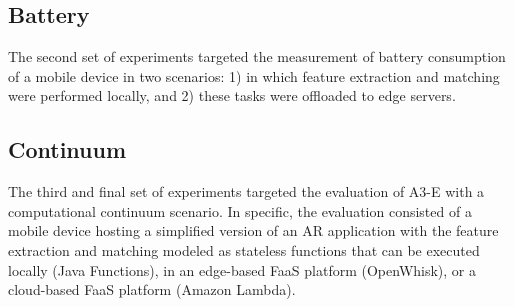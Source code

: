 \subsection{Battery} The second set of experiments targeted the measurement of battery consumption of a mobile device in two scenarios: 1) in which feature extraction and matching were performed locally, and 2) these tasks were offloaded to edge servers.

\subsection{Continuum} The third and final set of experiments targeted the evaluation of A3-E with a computational continuum scenario. In specific, the evaluation consisted of a mobile device hosting a simplified version of an AR application with the feature extraction and matching modeled as stateless functions that can be executed locally (Java Functions), in an edge-based FaaS platform (OpenWhisk), or a cloud-based FaaS platform (Amazon Lambda).